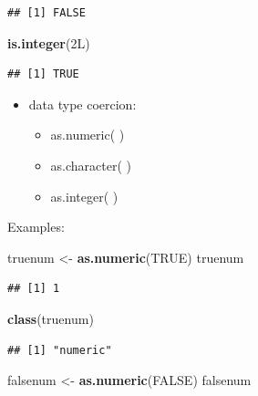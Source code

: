 \documentclass[]{book}
\newenvironment{Shaded}{\begin{snugshade}}{\end{snugshade}}
\newcommand{\KeywordTok}[1]{\textcolor[rgb]{0.13,0.29,0.53}{\textbf{{#1}}}}
\newcommand{\StringTok}[1]{\textcolor[rgb]{0.31,0.60,0.02}{{#1}}}
\newcommand{\OtherTok}[1]{\textcolor[rgb]{0.56,0.35,0.01}{{#1}}}
\newcommand{\NormalTok}[1]{{#1}}
\providecommand{\tightlist}{%
  \setlength{\itemsep}{0pt}\setlength{\parskip}{0pt}}
\begin{document}
\begin{verbatim}
## [1] FALSE
\end{verbatim}

\begin{Shaded}
\begin{Highlighting}[]
\KeywordTok{is.integer}\NormalTok{(2L)}
\end{Highlighting}
\end{Shaded}

\begin{verbatim}
## [1] TRUE
\end{verbatim}

\begin{itemize}
\tightlist
\item
  data type coercion:

  \begin{itemize}
  \tightlist
  \item
    as.numeric( )
  \item
    as.character( )\\
  \item
    as.integer( )
  \end{itemize}
\end{itemize}

Examples:

\begin{Shaded}
\begin{Highlighting}[]
\NormalTok{truenum <-}\StringTok{ }\KeywordTok{as.numeric}\NormalTok{(}\OtherTok{TRUE}\NormalTok{)}
\NormalTok{truenum}
\end{Highlighting}
\end{Shaded}

\begin{verbatim}
## [1] 1
\end{verbatim}

\begin{Shaded}
\begin{Highlighting}[]
\KeywordTok{class}\NormalTok{(truenum)}
\end{Highlighting}
\end{Shaded}

\begin{verbatim}
## [1] "numeric"
\end{verbatim}

\begin{Shaded}
\begin{Highlighting}[]
\NormalTok{falsenum <-}\StringTok{ }\KeywordTok{as.numeric}\NormalTok{(}\OtherTok{FALSE}\NormalTok{)}
\NormalTok{falsenum}
\end{Highlighting}
\end{Shaded}
\end{document}
